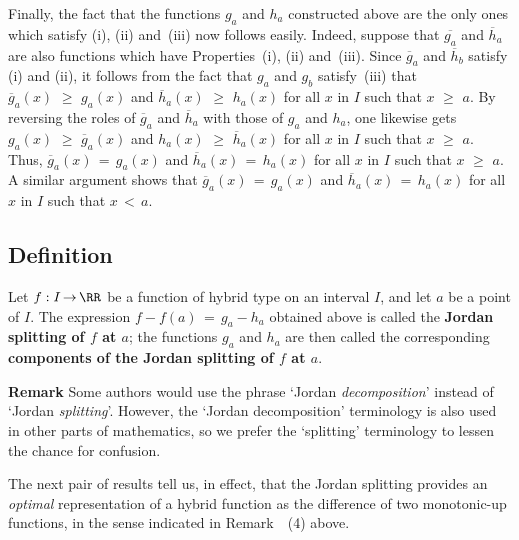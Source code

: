         Finally, the fact that the functions $g_{a}$ and $h_{a}$ constructed above are the only ones which satisfy (i), (ii) and~(iii) now follows easily.
    Indeed, suppose that $\overline{g_{a}}$ and $\overline{h}_{a}$ are also functions which have Properties~(i), (ii) and~(iii).
    Since $\overline{g}_{a}$ and $\overline{h}_{b}$ satisfy (i) and (ii), it follows from the fact that $g_{a}$ and $g_{b}$ satisfy~(iii) that $\overline{g}_{a}(x)\,\,{\geq}\,\,g_{a}(x)$ and $\overline{h}_{a}(x)\,\,{\geq}\,\,h_{a}(x)$ for all $x$ in $I$ such that $x\,\,{\geq}\,\,a$.
    By reversing the roles of $\overline{g}_{a}$ and $\overline{h}_{a}$ with those of $g_{a}$ and $h_{a}$, one likewise gets $g_{a}(x)\,\,{\geq}\,\,\overline{g}_{a}(x)$ and $h_{a}(x)\,\,{\geq}\,\,\overline{h}_{a}(x)$ for all $x$ in $I$ such that $x\,\,{\geq}\,\,a$.
    Thus, $\overline{g}_{a}(x) \,=\, g_{a}(x)$ and $\overline{h}_{a}(x) \,=\, h_{a}(x)$ for all $x$ in $I$ such that $x\,\,{\geq}\,\,a$.
    A similar argument shows that $\overline{g}_{a}(x) \,=\, g_{a}(x)$ and $\overline{h}_{a}(x) \,=\, h_{a}(x)$ for all $x$ in $I$ such that $x\,<\,a$.

\V
\V
             \subsection{\small{\bf Definition}}
            \label{DefF40.115}

\V

        Let $f:I \,{\rightarrow}\, {\RR}$ be a function of hybrid type on an interval $I$, and let $a$ be a point of $I$.
    The expression $f-f(a) \,=\, g_{a}-h_{a}$ obtained above is called the {\bf Jordan splitting of $f$ at $a$};
    the functions $g_{a}$ and $h_{a}$ are then called the corresponding {\bf components of the Jordan splitting of $f$ at $a$}.

\V

        {\bf Remark} Some authors would use the phrase `Jordan {\em decomposition}' instead of `Jordan {\em splitting}'.
    However, the `Jordan decomposition' terminology is also used in other parts of mathematics, so we prefer the `splitting' terminology to lessen the chance for confusion.

\V
\V

        The next pair of results tell us, in effect, that the Jordan splitting provides an {\em optimal} representation of a hybrid function as the difference of two monotonic-up functions,
    in the sense indicated in Remark~~(4) above.

